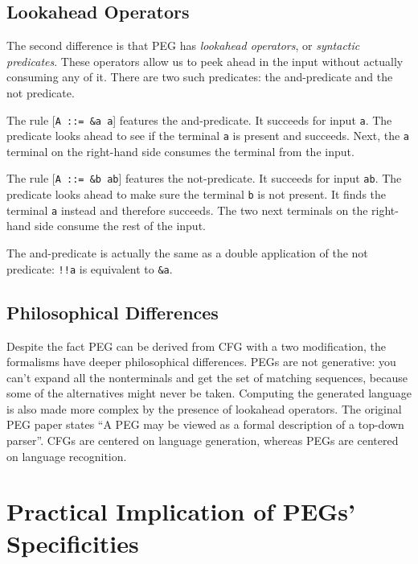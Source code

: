 \subsection{Lookahead Operators}
\label{lookahead_operators}

The second difference is that PEG has \emph{lookahead operators}, or
\emph{syntactic predicates}. These operators allow us to peek ahead in the input
without actually consuming any of it. There are two such predicates: the
and-predicate and the not predicate.

The rule [\texttt{A ::= \&a a}] features the and-predicate. It succeeds for
input \texttt{a}. The predicate looks ahead to see if the terminal \texttt{a} is
present and succeeds. Next, the \texttt{a} terminal on the right-hand side
consumes the terminal from the input.

The rule [\texttt{A ::= \&b ab}] features the not-predicate. It succeeds for
input \texttt{ab}. The predicate looks ahead to make sure the terminal
\texttt{b} is not present. It finds the terminal \texttt{a} instead and
therefore succeeds. The two next terminals on the right-hand side consume the
rest of the input.

The and-predicate is actually the same as a double application of the not
predicate: \texttt{!!a} is equivalent to \texttt{\&a}.

\subsection{Philosophical Differences}

Despite the fact PEG can be derived from CFG with a two modification, the
formalisms have deeper philosophical differences. PEGs are not generative: you
can't expand all the nonterminals and get the set of matching sequences, because
some of the alternatives might never be taken. Computing the generated language
is also made more complex by the presence of lookahead operators. The original
PEG paper \cite{ford2004} states ``A PEG may be viewed as a formal description
of a top-down parser''. CFGs are centered on language generation, whereas PEGs
are centered on language recognition.

\section{Practical Implication of PEGs' Specificities}
\label{peg_implications}

